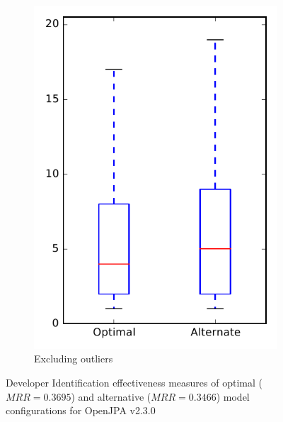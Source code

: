 \begin{figure}
\begin{subfigure}{.4\textwidth}
        \includegraphics[height=0.4\textheight]{figures/combo/dit_rq1_openjpa_no_outlier}
        \caption{Excluding outliers}\label{fig:combo:dit:rq1:openjpa_no_outlier}
    \end{subfigure}
\caption[Developer Identification effectiveness measures of optimal and alternative model configurations for OpenJPA v2.3.0]%
{Developer Identification effectiveness measures of optimal ($MRR=0.3695$) and alternative ($MRR=0.3466$) model configurations for OpenJPA v2.3.0}
\label{fig:combo:dit:rq1:openjpa}
\end{figure}
